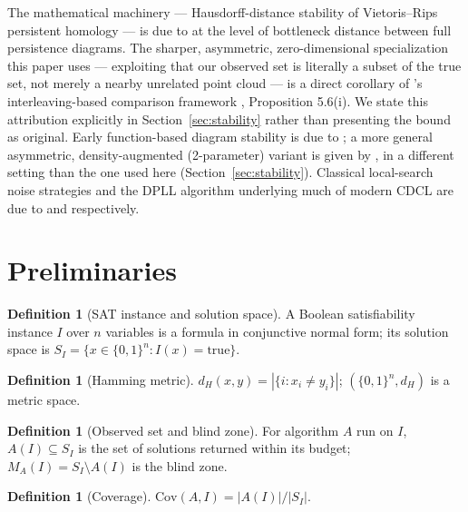 \documentclass[11pt]{article}
\theoremstyle{definition}
\newtheorem{definition}[theorem]{Definition}
\theoremstyle{remark}
\newcommand{\Shat}{S_I}
\newcommand{\Ahat}[1]{A(#1)}
\newcommand{\dH}{d_H}
\newcommand{\Cov}{\mathrm{Cov}}
\begin{document}
The mathematical machinery --- Hausdorff-distance stability of Vietoris--Rips persistent homology --- is due to \citet{chazal2014persistence} at the level of bottleneck distance between full persistence diagrams. The sharper, asymmetric, zero-dimensional specialization this paper uses --- exploiting that our observed set is literally a subset of the true set, not merely a nearby unrelated point cloud --- is a direct corollary of \citeauthor{harker2019comparison}'s interleaving-based comparison framework \citep{harker2019comparison}, Proposition 5.6(i). We state this attribution explicitly in Section~\ref{sec:stability} rather than presenting the bound as original. Early function-based diagram stability is due to \citet{cohensteiner2007stability}; a more general asymmetric, density-augmented (2-parameter) variant is given by \citet{blumberglesnick2020stability}, in a different setting than the one used here (Section~\ref{sec:stability}). Classical local-search noise strategies and the DPLL algorithm underlying much of modern CDCL are due to \citet{selman1994noise} and \citet{davis1962machine} respectively.

\section{Preliminaries}
\label{sec:preliminaries}

\begin{definition}[SAT instance and solution space]
A Boolean satisfiability instance $I$ over $n$ variables is a formula in conjunctive normal form; its solution space is $\Shat = \{x \in \{0,1\}^n : I(x) = \mathrm{true}\}$.
\end{definition}

\begin{definition}[Hamming metric]
$\dH(x,y) = |\{i : x_i \neq y_i\}|$; $(\{0,1\}^n, \dH)$ is a metric space.
\end{definition}

\begin{definition}[Observed set and blind zone]
For algorithm $A$ run on $I$, $\Ahat{I} \subseteq \Shat$ is the set of solutions returned within its budget; $M_A(I) = \Shat \setminus \Ahat{I}$ is the blind zone.
\end{definition}

\begin{definition}[Coverage]
$\Cov(A,I) = |\Ahat{I}| / |\Shat|$.
\end{definition}
\end{document}
